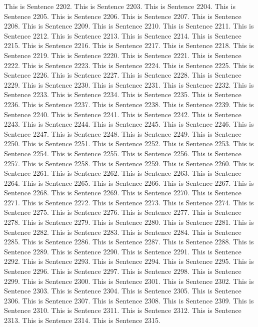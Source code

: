 \documentclass{article}
\begin{document}
This is Sentence 2202.
This is Sentence 2203.
This is Sentence 2204.
This is Sentence 2205.
This is Sentence 2206.
This is Sentence 2207.
This is Sentence 2208.
This is Sentence 2209.
This is Sentence 2210.
This is Sentence 2211.
This is Sentence 2212.
This is Sentence 2213.
This is Sentence 2214.
This is Sentence 2215.
This is Sentence 2216.
This is Sentence 2217.
This is Sentence 2218.
This is Sentence 2219.
This is Sentence 2220.
This is Sentence 2221.
This is Sentence 2222.
This is Sentence 2223.
This is Sentence 2224.
This is Sentence 2225.
This is Sentence 2226.
This is Sentence 2227.
This is Sentence 2228.
This is Sentence 2229.
This is Sentence 2230.
This is Sentence 2231.
This is Sentence 2232.
This is Sentence 2233.
This is Sentence 2234.
This is Sentence 2235.
This is Sentence 2236.
This is Sentence 2237.
This is Sentence 2238.
This is Sentence 2239.
This is Sentence 2240.
This is Sentence 2241.
This is Sentence 2242.
This is Sentence 2243.
This is Sentence 2244.
This is Sentence 2245.
This is Sentence 2246.
This is Sentence 2247.
This is Sentence 2248.
This is Sentence 2249.
This is Sentence 2250.
This is Sentence 2251.
This is Sentence 2252.
This is Sentence 2253.
This is Sentence 2254.
This is Sentence 2255.
This is Sentence 2256.
This is Sentence 2257.
This is Sentence 2258.
This is Sentence 2259.
This is Sentence 2260.
This is Sentence 2261.
This is Sentence 2262.
This is Sentence 2263.
This is Sentence 2264.
This is Sentence 2265.
This is Sentence 2266.
This is Sentence 2267.
This is Sentence 2268.
This is Sentence 2269.
This is Sentence 2270.
This is Sentence 2271.
This is Sentence 2272.
This is Sentence 2273.
This is Sentence 2274.
This is Sentence 2275.
This is Sentence 2276.
This is Sentence 2277.
This is Sentence 2278.
This is Sentence 2279.
This is Sentence 2280.
This is Sentence 2281.
This is Sentence 2282.
This is Sentence 2283.
This is Sentence 2284.
This is Sentence 2285.
This is Sentence 2286.
This is Sentence 2287.
This is Sentence 2288.
This is Sentence 2289.
This is Sentence 2290.
This is Sentence 2291.
This is Sentence 2292.
This is Sentence 2293.
This is Sentence 2294.
This is Sentence 2295.
This is Sentence 2296.
This is Sentence 2297.
This is Sentence 2298.
This is Sentence 2299.
This is Sentence 2300.
This is Sentence 2301.
This is Sentence 2302.
This is Sentence 2303.
This is Sentence 2304.
This is Sentence 2305.
This is Sentence 2306.
This is Sentence 2307.
This is Sentence 2308.
This is Sentence 2309.
This is Sentence 2310.
This is Sentence 2311.
This is Sentence 2312.
This is Sentence 2313.
This is Sentence 2314.
This is Sentence 2315.
\end{document}
